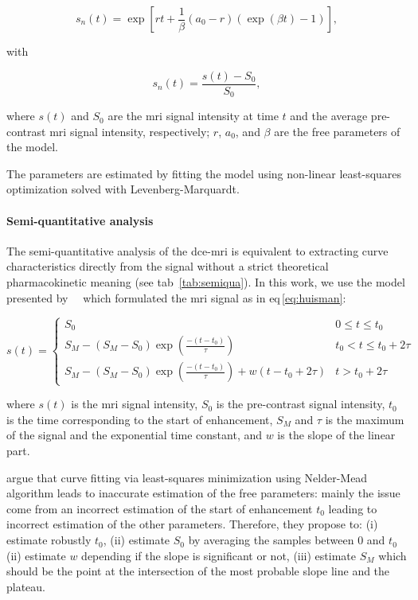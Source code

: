 \begin{equation}
  s_n(t) = \exp\left[rt + \frac{1}{\beta} \left( a_0 - r \right) \left( \exp(\beta t) - 1 \right) \right],
  \label{eq:pun2}
\end{equation}

\noindent with

\begin{equation}
  s_n(t) = \frac{s(t) - S_0}{S_0},
  \label{eq:enh}
\end{equation}

\noindent where $s(t)$ and $S_0$ are the \ac{mri} signal intensity at time $t$ and the average pre-contrast \ac{mri} signal intensity, respectively; $r$, $a_0$, and $\beta$ are the free parameters of the model.

The parameters are estimated by fitting the model using non-linear least-squares optimization solved with Levenberg-Marquardt.

\paragraph{Semi-quantitative analysis}\label{par:chp5:DCE-norm:semi}

The semi-quantitative analysis of the \ac{dce}-\ac{mri} is equivalent to extracting curve characteristics directly from the signal without a strict theoretical pharmacokinetic meaning (see \acs{tab}~\ref{tab:semiqua}).
In this work, we use the model presented by~\citeauthor{huisman2001accurate}~\cite{huisman2001accurate} which formulated the \ac{mri} signal as in \acs{eq}\,\eqref{eq:huisman}:

\begin{equation}
  s(t) = \begin{cases}
    S_0 & 0 \leq t \leq t_0 \\
    S_M - (S_M - S_0) \exp\left( \frac{-(t - t_0)}{\tau} \right) & t_0 < t \leq t_0 + 2 \tau \\
    S_M - (S_M - S_0) \exp\left( \frac{-(t - t_0)}{\tau} \right) + w(t - t_0 + 2 \tau) & t > t_0 + 2 \tau
  \end{cases}
  \label{eq:huisman}
\end{equation}

\noindent where $s(t)$ is the \ac{mri} signal intensity, $S_0$ is the pre-contrast signal intensity, $t_0$ is the time corresponding to the start of enhancement, $S_M$ and $\tau$ is the maximum of the signal and the exponential time constant, and $w$ is the slope of the linear part.

\citeauthor{huisman2001accurate} argue that curve fitting via least-squares minimization using Nelder-Mead algorithm leads to inaccurate estimation of the free parameters: mainly the issue come from an incorrect estimation of the start of enhancement $t_0$ leading to incorrect estimation of the other parameters.
Therefore, they propose to:
(i) estimate robustly $t_0$,
(ii) estimate $S_0$ by averaging the samples between $0$ and $t_0$
(ii) estimate $w$ depending if the slope is significant or not,
(iii) estimate $S_M$ which should be the point at the intersection of the most probable slope line and the plateau.

